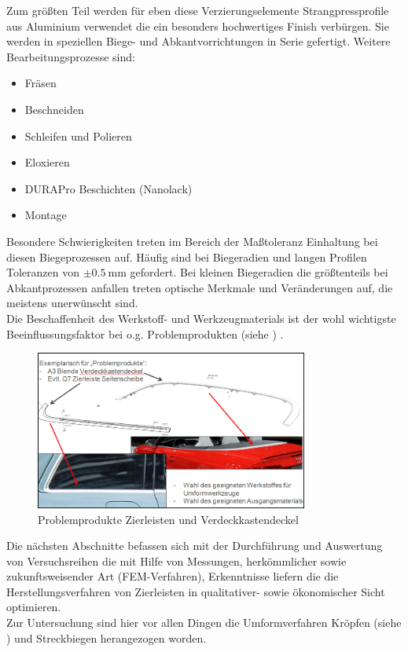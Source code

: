 \documentclass[12pt,a4paper,parskip]{scrartcl}
\begin{document}
Zum größten Teil werden für eben diese Verzierungselemente
Strangpressprofile aus Aluminium verwendet die ein besonders hochwertiges Finish verbürgen. Sie werden in speziellen Biege- und Abkantvorrichtungen in Serie gefertigt.
 Weitere Bearbeitungsprozesse sind: \begin{itemize}
 \item Fräsen
 \item Beschneiden
 \item Schleifen und Polieren
 \item Eloxieren
 \item DURAPro Beschichten (Nanolack)
 \item Montage
 \end{itemize}
   Besondere Schwierigkeiten treten im Bereich der Maßtoleranz Einhaltung bei diesen Biegeprozessen auf. Häufig sind bei  Biegeradien und langen Profilen Toleranzen von $\pm \SI{0.5}{\milli\meter}$ gefordert. Bei kleinen Biegeradien die größtenteils bei Abkantprozessen anfallen treten optische Merkmale und Veränderungen auf, die meistens unerwünscht sind.\\
 Die Beschaffenheit des Werkstoff- und Werkzeugmaterials ist der wohl wichtigste Beeinflussungsfaktor bei o.g. Problemprodukten (siehe ) .
 \begin{figure}[hbtp]
 \centering
 \includegraphics[width=0.8\textwidth]{ZierleisteVerdeckklappendeckel}
 \caption{Problemprodukte Zierleisten und Verdeckkastendeckel}
 \label{fig:Verdeckkastendeckel}
 \end{figure}

Die nächsten Abschnitte befassen sich mit der Durchführung und Auswertung von Versuchsreihen die mit Hilfe von Messungen, herkömmlicher sowie zukunftsweisender Art (FEM-Verfahren), Erkenntnisse liefern  die die Herstellungsverfahren von Zierleisten  in qualitativer- sowie ökonomischer Sicht  optimieren.\\
Zur Untersuchung   sind hier vor allen Dingen die Umformverfahren  Kröpfen (siehe )  und Streckbiegen herangezogen worden. 
\end{document}
